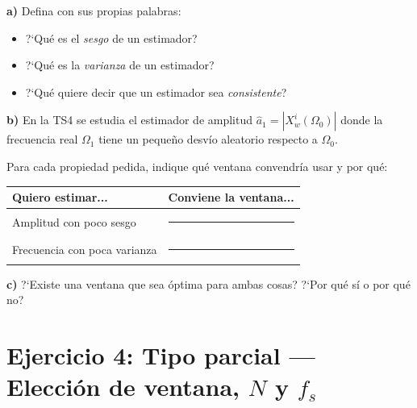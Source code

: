 \documentclass[11pt, a4paper]{article}
\begin{document}
\begin{enun}
\textbf{a)} Defina con sus propias palabras:
\begin{itemize}[noitemsep]
  \item ?`Qu\'e es el \emph{sesgo} de un estimador?
  \item ?`Qu\'e es la \emph{varianza} de un estimador?
  \item ?`Qu\'e quiere decir que un estimador sea \emph{consistente}?
\end{itemize}

\textbf{b)} En la TS4 se estudia el estimador de amplitud
$\hat{a}_1 = |X_w^i(\Omega_0)|$ donde la frecuencia real $\Omega_1$ tiene
un peque\~no desv\'io aleatorio respecto a $\Omega_0$.

Para cada propiedad pedida, indique qu\'e ventana convendr\'ia usar
y por qu\'e:

\begin{center}
\begin{tabular}{lc}
\toprule
Quiero estimar... & Conviene la ventana... \\
\midrule
Amplitud con poco sesgo            & \rule{4cm}{0.3pt} \\
Frecuencia con poca varianza       & \rule{4cm}{0.3pt} \\
\bottomrule
\end{tabular}
\end{center}

\textbf{c)} ?`Existe una ventana que sea \'optima para ambas cosas?
?`Por qu\'e s\'i o por qu\'e no?
\end{enun}

\section*{Ejercicio 4: Tipo parcial --- Elecci\'on de ventana, $N$ y $f_s$}
\end{document}
